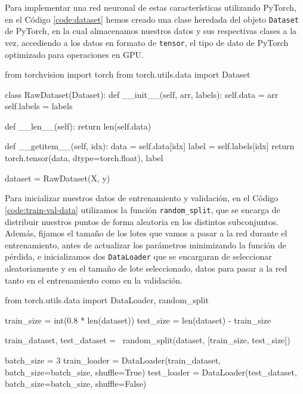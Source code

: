Para implementar una red neuronal de estas características utilizando PyTorch, en el Código \ref{code:dataset} hemos creado una clase heredada del objeto \texttt{Dataset} de PyTorch, en la cual almacenamos nuestros datos y sus respectivas clases a la vez, accediendo a los datos en formato de \texttt{tensor}, el tipo de dato de PyTorch optimizado para operaciones en GPU.

\begin{mypython}[float={h}, caption={\texttt{Dataset} de los datos artificiales.}, label={code:dataset}]
from torchvision import torch
from torch.utils.data import Dataset

class RawDataset(Dataset):
  def __init__(self, arr, labels):
      self.data = arr
      self.labels = labels

  def __len__(self):
      return len(self.data)

  def __getitem__(self, idx):
      data = self.data[idx]
      label = self.labels[idx]
      return torch.tensor(data, dtype=torch.float), label

dataset = RawDataset(X, y)
\end{mypython}

Para inicializar nuestros datos de entrenamiento y validación, en el Código \ref{code:train-val-data} utilizamos la función \texttt{random\_split}, que se encarga de distribuir nuestros puntos de forma aleatoria en los distintos subconjuntos. Además, fijamos el tamaño de los lotes que vamos a pasar a la red durante el entrenamiento, antes de actualizar los parámetros minimizando la función de pérdida, e inicializamos dos \texttt{DataLoader} que se encargaran de seleccionar aleatoriamente y en el tamaño de lote seleccionado, datos para pasar a la red tanto en el entrenamiento como en la validación.

\begin{mypython}[float={h}, caption={Inicialización de los conjuntos de entrenamiento y validación.}, label={code:train-val-data}]
from torch.utils.data import DataLoader, random_split

train_size = int(0.8 * len(dataset))
test_size = len(dataset) - train_size 

train_dataset, test_dataset = \
  random_split(dataset, [train_size, test_size])

batch_size = 3
train_loader = DataLoader(train_dataset,
                          batch_size=batch_size,
                          shuffle=True)
test_loader = DataLoader(test_dataset,
                         batch_size=batch_size, 
                         shuffle=False)
\end{mypython}

